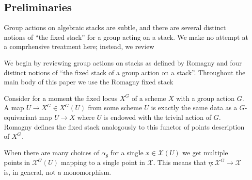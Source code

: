 \subsection{Preliminaries}\label{rl-0003}
Group actions on algebraic stacks are subtle, and there are several distinct notions of ``the fixed stack'' for a group acting on a stack. We make no attempt at a comprhensive treatment here; instead, we review 

We begin by reviewing group actions on stacks as defined by Romagny \cite{romagny_GroupActionsStacks2005} and four distinct notions of ``the fixed stack of a group action on a stack''. Throughout the main body of this paper we use the Romagny fixed stack




Consider for a moment the fixed locus \(X^G\) of a scheme \(X\) with a group action \(G\). A map \(U\to X^G \in X^G(U)\) from some scheme \(U\) is exactly the same data as a \(G\)-equivariant map \(U\to X\) where \(U\) is endowed with the trivial action of \(G\). Romagny defines the fixed stack analogously to this functor of points description of \(X^G\). 



When there are many choices of \(\alpha_g\) for a single \(x\in \mathcal X(U)\) we get multiple points in \(\mathcal X^G(U)\) mapping to a single point in \(\mathcal X\). This means that \(\eta:\mathcal X^G\to \mathcal X\) is, in general, not a monomorphism.





